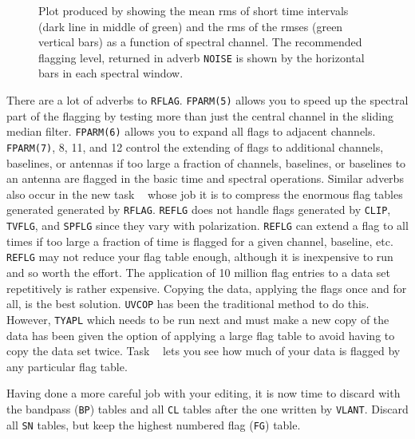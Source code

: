 \begin{figure}
\centering
{}
\caption[{\tt RFLAG} display]{Plot produced by {\tt {}}
showing the mean rms of short time intervals (dark line in middle of
green) and the rms of the rmses (green vertical bars) as a function of
spectral channel.  The recommended flagging level, returned in adverb
{\tt NOISE} is shown by the horizontal bars in each spectral window.
}
\label{fig:rflag}
\end{figure}

There are a lot of adverbs to {\tt RFLAG}\@.  {\tt FPARM(5)} allows
you to speed up the spectral part of the flagging by testing more than
just the central channel in the sliding median filter.  {\tt FPARM(6)}
allows you to expand all flags to adjacent channels.  {\tt FPARM(7)},
8, 11, and 12 control the extending of flags to additional channels,
baselines, or antennas if too large a fraction of channels, baselines,
or baselines to an antenna are flagged in the basic time and spectral
operations.  Similar adverbs also occur in the new task {\tt
{}} whose job it is to compress the enormous flag tables
generated generated by {\tt RFLAG}\@.  {\tt REFLG} does not handle
flags generated by {\tt CLIP}, {\tt TVFLG}, and {\tt SPFLG} since they
vary with polarization.  {\tt REFLG} can extend a flag to all times if
too large a fraction of time is flagged for a given channel, baseline,
etc.  {\tt REFLG} may not reduce your flag table enough, although it
is inexpensive to run and so worth the effort.  The application of 10
million flag entries to a data set repetitively is rather expensive.
Copying the data, applying the flags once and for all, is the best
solution.  {\tt UVCOP} has been the traditional method to do this.
However, {\tt TYAPL} which needs to be run next and must make a new
copy of the data has been given the option of applying a large flag
table to avoid having to copy the data set twice.  Task {\tt
{}} lets you see how much of your data is flagged by any
particular flag table.

\vfill\eject
{}

Having done a more careful job with your editing, it is now time to
discard with {\tt {}} the bandpass ({\tt BP}) tables and
all {\tt CL} tables after the one written by {\tt VLANT}\@.  Discard
all {\tt SN} tables, but keep the highest numbered flag ({\tt FG})
table.

